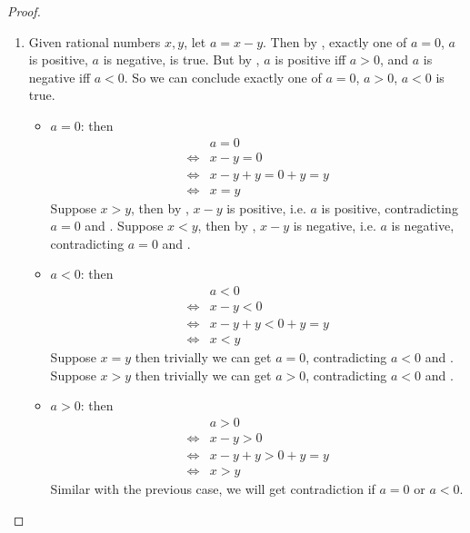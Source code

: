 \begin{proof}
\begin{enumerate}
    \item {}
        Given rational numbers \(x, y\), let \(a = x - y\).
        Then by , exactly one of \(a = 0\), \(a\) is positive, \(a\) is negative, is true. But by , \(a\) is positive iff \(a > 0\), and \(a\) is negative iff \(a < 0\).
        So we can conclude exactly one of \(a = 0\), \(a > 0\), \(a < 0\) is true.
        \begin{itemize}
            \item \(a = 0\): then
                \begin{align*}
                         & a = 0 \\
                    \iff & x - y = 0 \\
                    \iff & x - y + y = 0 + y = y \\
                    \iff & x = y
                \end{align*}
                Suppose \(x > y\), then by , \(x - y\) is positive, i.e. \(a\) is positive, contradicting \(a = 0\) and .
                Suppose \(x < y\), then by , \(x - y\) is negative, i.e. \(a\) is negative, contradicting \(a = 0\) and .
            \item \(a < 0\): then
                \begin{align*}
                         & a < 0 \\
                    \iff & x - y < 0 \\
                    \iff & x - y + y < 0 + y = y \\
                    \iff & x < y
                \end{align*}
                Suppose \(x = y\) then trivially we can get \(a = 0\), contradicting \(a < 0\) and .
                Suppose \(x > y\) then trivially we can get \(a > 0\), contradicting \(a < 0\) and .
            \item \(a > 0\): then
                \begin{align*}
                         & a > 0 \\
                    \iff & x - y > 0 \\
                    \iff & x - y + y > 0 + y = y \\
                    \iff & x > y
                \end{align*}
                Similar with the previous case, we will get contradiction if \(a = 0\) or \(a < 0\).

\end{itemize}
\end{enumerate}
\end{proof}

